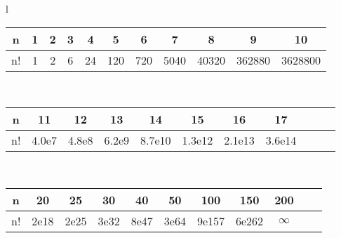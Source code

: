 
\begin{center}
\begin{tabular}{l}
\begin{tabular}{c|c@{\ }c@{\ }c@{\ }c@{\ }c@{\ }c@{\ }c@{\ }c@{\ }c@{\ }c}
n  & 1 & 2 & 3 & 4  & 5   & 6   & 7    & 8     & 9      & 10\\
\hline
n! & 1 & 2 & 6 & 24 & 120 & 720 & 5040 & 40320 & 362880 & 3628800\\
\end{tabular}\\
\begin{tabular}{c|c@{\ }c@{\ }c@{\ }c@{\ }c@{\ }c@{\ }c@{\ }c@{\ }c@{\ }c}
n  & 11    & 12    & 13    & 14     & 15     & 16     & 17\\
\hline
n! & 4.0e7 & 4.8e8 & 6.2e9 & 8.7e10 & 1.3e12 & 2.1e13 & 3.6e14\\
\end{tabular}\\
\begin{tabular}{c|c@{\ }c@{\ }c@{\ }c@{\ }c@{\ }c@{\ }c@{\ }c@{\ }c@{\ }c}
n  & 20   & 25   & 30   & 40   & 50   & 100   & 150   & 200\\
\hline
n! & 2e18 & 2e25 & 3e32 & 8e47 & 3e64 & 9e157 & 6e262 & $\infty$\\
\end{tabular}
\end{tabular}
\end{center}

